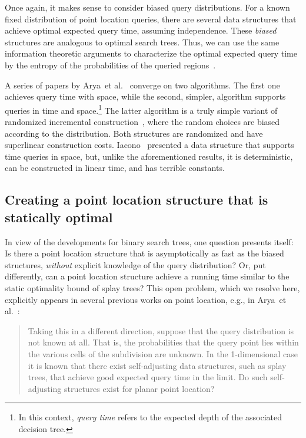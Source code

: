 \documentclass[11pt]{article}
\newcommand{\etal}{et al.}
\begin{document}
Once again, it makes sense to consider biased
query distributions.
For a known fixed distribution of point location queries, there are
several data structures that achieve optimal expected query time,
assuming independence. 
These \emph{biased} structures are
analogous to optimal search trees. Thus, we can use the same information
theoretic arguments to characterize the optimal expected query time
by the entropy  of the probabilities of the 
queried regions~\cite[Claim~2.2]{AilonChClLiMuSe11}.
 
A series of papers by 
Arya~\etal~\cite{AryaMaMo07,AryaMaMoWo07,
AryaMaMo01,AryaMaMo01a,AryaMaMo00,AryaChMoHa00}
converge on two algorithms. The first one achieves query time 
 with
 space, while the second, simpler, algorithm supports queries in time  and  space.\footnote{In this context,
\emph{query time} refers to the expected depth of the associated
decision tree.} The latter algorithm is a 
truly simple variant of randomized incremental 
construction~\cite{trapseidel,Mulmuley90}, where the 
random choices are biased according to the distribution. Both structures 
are randomized and have superlinear construction costs. 
Iacono~\cite{Iacono04} presented a data structure 
that supports
 time queries in  space, but, 
unlike the aforementioned results, it is
deterministic, can be constructed in linear time, and has terrible constants.

\subsection{Creating a point location structure that is statically optimal}

In view of the developments for binary search trees, one 
question presents itself:  Is there a point location structure that is
asymptotically as fast as the biased structures, \emph{without} explicit
knowledge of the query distribution? Or, put differently, can a point
location structure achieve a running time similar to the static optimality bound
of splay trees? This open problem, which we resolve here, explicitly appears in
several previous works on point location, e.g., in
Arya~et al.~\cite[Section 6]{AryaMaMoWo07}:

\begin{quote}
Taking this in a different direction, suppose that the query
distribution is not known at all. That is, the probabilities that the query
point lies within the various cells of the subdivision are unknown. In the
1-dimensional case it is known that there exist self-adjusting data structures,
such as splay trees, that achieve good expected query time in the limit.
Do such self-adjusting structures 
exist for planar point location?
\end{quote}
\end{document}
